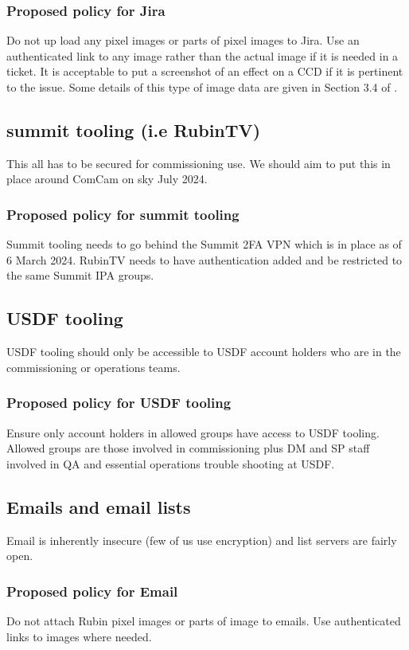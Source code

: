 \subsubsection{Proposed policy for Jira}
Do not up load any pixel images or parts of pixel images to Jira.
Use an authenticated link to any image rather than the actual image if it is needed in a ticket.
It is acceptable to put a screenshot of an effect on a CCD if it is pertinent to the issue.
Some details of this type of image data are given in Section 3.4 of .

\subsection{summit tooling (i.e RubinTV)}
This all has to be secured for commissioning use.
We should aim to put this in place around ComCam on sky July 2024.

\subsubsection{Proposed policy for summit tooling}
Summit tooling needs to go behind the Summit 2FA VPN which is in place as of 6 March 2024.
RubinTV needs to have authentication added and be restricted to the same Summit IPA groups.

\subsection{USDF tooling}
USDF tooling should only be accessible to USDF account holders who are in the commissioning or operations teams.
\subsubsection{Proposed policy for USDF tooling}
Ensure only account holders in allowed groups have access to USDF tooling.
Allowed groups are those involved in commissioning plus DM and SP staff involved in QA and essential operations trouble shooting at USDF.

\subsection{Emails and email  lists }
Email is inherently insecure (few of us use encryption) and list servers are fairly open.

\subsubsection{Proposed policy for Email}
Do not attach Rubin pixel images or parts of image to emails.
Use authenticated links to images where needed.


